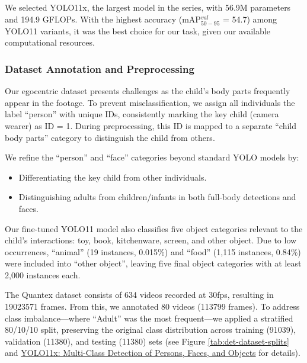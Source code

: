 \documentclass[
  man,floatsintext]{apa6}
\providecommand{\tightlist}{%
  \setlength{\itemsep}{0pt}\setlength{\parskip}{0pt}}
\begin{document}
We selected YOLO11x, the largest model in the series, with 56.9M parameters and 194.9 GFLOPs. With the highest accuracy (mAP\(^{val}_{50-95}\) = 54.7) among YOLO11 variants, it was the best choice for our task, given our available computational resources.

\subsubsection{Dataset Annotation and Preprocessing}\label{dataset-annotation-and-preprocessing}

Our egocentric dataset presents challenges as the child's body parts frequently appear in the footage. To prevent misclassification, we assign all individuals the label ``person'' with unique IDs, consistently marking the key child (camera wearer) as ID = 1. During preprocessing, this ID is mapped to a separate ``child body parts'' category to distinguish the child from others.

We refine the ``person'' and ``face'' categories beyond standard YOLO models by:

\begin{itemize}
\tightlist
\item
  Differentiating the key child from other individuals.
\item
  Distinguishing adults from children/infants in both full-body detections and faces.
\end{itemize}

Our fine-tuned YOLO11 model also classifies five object categories relevant to the child's interactions: toy, book, kitchenware, screen, and other object. Due to low occurrences, ``animal'' (19 instances, 0.015\%) and ``food'' (1,115 instances, 0.84\%) were included into ``other object'', leaving five final object categories with at least 2,000 instances each.

The Quantex dataset consists of 634 videos recorded at 30fps, resulting in 19023571 frames. From this, we annotated 80 videos (113799 frames). To address class imbalance---where ``Adult'' was the most frequent---we applied a stratified 80/10/10 split, preserving the original class distribution across training (91039), validation (11380), and testing (11380) sets (see Figure \ref{tab:det-dataset-splits} and \hyperref[sup-yolo11x]{YOLO11x: Multi-Class Detection of Persons, Faces, and Objects} for details).
\end{document}
